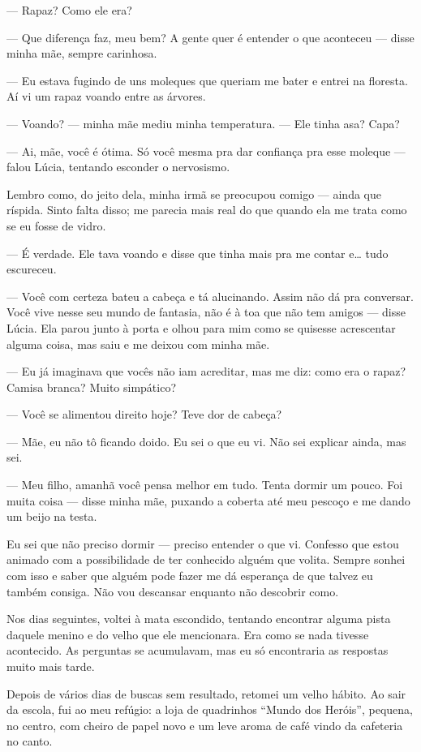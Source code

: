 — Rapaz? Como ele era?

— Que diferença faz, meu bem? A gente quer é entender o que aconteceu — disse minha mãe, sempre carinhosa.

— Eu estava fugindo de uns moleques que queriam me bater e entrei na floresta. Aí vi um rapaz voando entre as árvores.

— Voando? — minha mãe mediu minha temperatura. — Ele tinha asa? Capa?

— Ai, mãe, você é ótima. Só você mesma pra dar confiança pra esse moleque — falou Lúcia, tentando esconder o nervosismo.

Lembro como, do jeito dela, minha irmã se preocupou comigo — ainda que ríspida. Sinto falta disso; me parecia mais real do que quando ela me trata como se eu fosse de vidro.

— É verdade. Ele tava voando e disse que tinha mais pra me contar e… tudo escureceu.

— Você com certeza bateu a cabeça e tá alucinando. Assim não dá pra conversar. Você vive nesse seu mundo de fantasia, não é à toa que não tem amigos — disse Lúcia. Ela parou junto à porta e olhou para mim como se quisesse acrescentar alguma coisa, mas saiu e me deixou com minha mãe.

— Eu já imaginava que vocês não iam acreditar, mas me diz: como era o rapaz? Camisa branca? Muito simpático?

— Você se alimentou direito hoje? Teve dor de cabeça?

— Mãe, eu não tô ficando doido. Eu sei o que eu vi. Não sei explicar ainda, mas sei.

— Meu filho, amanhã você pensa melhor em tudo. Tenta dormir um pouco. Foi muita coisa — disse minha mãe, puxando a coberta até meu pescoço e me dando um beijo na testa.

Eu sei que não preciso dormir — preciso entender o que vi. Confesso que estou animado com a possibilidade de ter conhecido alguém que volita. Sempre sonhei com isso e saber que alguém pode fazer me dá esperança de que talvez eu também consiga. Não vou descansar enquanto não descobrir como.

Nos dias seguintes, voltei à mata escondido, tentando encontrar alguma pista daquele menino e do velho que ele mencionara. Era como se nada tivesse acontecido. As perguntas se acumulavam, mas eu só encontraria as respostas muito mais tarde.

Depois de vários dias de buscas sem resultado, retomei um velho hábito. Ao sair da escola, fui ao meu refúgio: a loja de quadrinhos “Mundo dos Heróis”, pequena, no centro, com cheiro de papel novo e um leve aroma de café vindo da cafeteria no canto.

